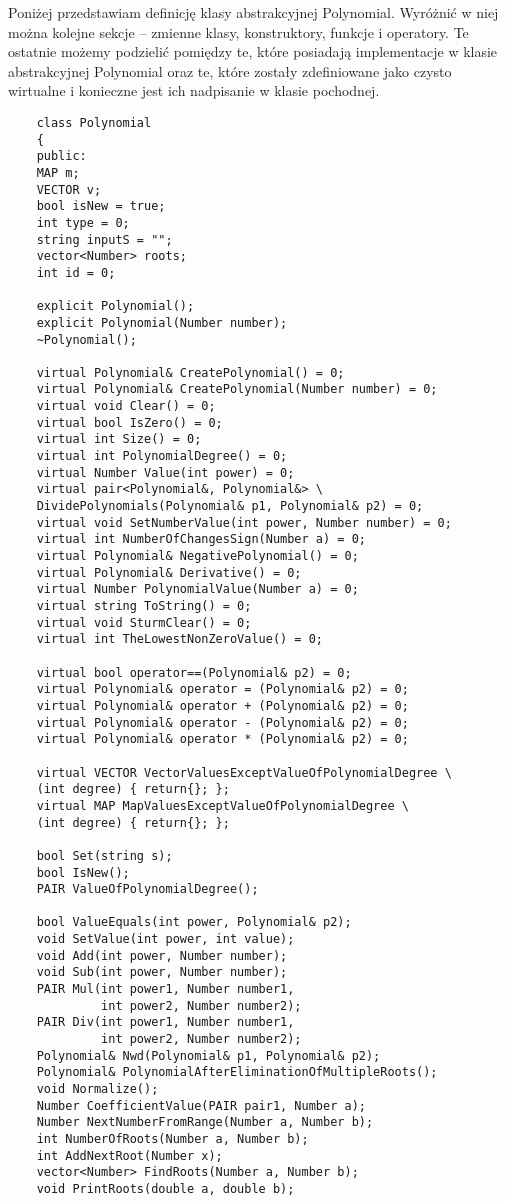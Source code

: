 \documentclass[oneside,a4paper]{book}
\begin{document}
	Poniżej przedstawiam definicję klasy abstrakcyjnej Polynomial. Wyróżnić w niej można kolejne sekcje -- zmienne klasy, konstruktory, funkcje i operatory. Te ostatnie możemy podzielić pomiędzy te, które posiadają implementacje w klasie abstrakcyjnej Polynomial oraz te, które zostały zdefiniowane jako czysto wirtualne i konieczne jest ich nadpisanie w klasie pochodnej.
	
	\begin{lstlisting}
	class Polynomial
	{
	public:
	MAP m;
	VECTOR v;
	bool isNew = true;
	int type = 0;
	string inputS = "";
	vector<Number> roots;
	int id = 0;
	
	explicit Polynomial();
	explicit Polynomial(Number number);
	~Polynomial();
	
	virtual Polynomial& CreatePolynomial() = 0;
	virtual Polynomial& CreatePolynomial(Number number) = 0;
	virtual void Clear() = 0;
	virtual bool IsZero() = 0;
	virtual int Size() = 0;
	virtual int PolynomialDegree() = 0;
	virtual Number Value(int power) = 0;
	virtual pair<Polynomial&, Polynomial&> \
	DividePolynomials(Polynomial& p1, Polynomial& p2) = 0;
	virtual void SetNumberValue(int power, Number number) = 0;
	virtual int NumberOfChangesSign(Number a) = 0;
	virtual Polynomial& NegativePolynomial() = 0;
	virtual Polynomial& Derivative() = 0;
	virtual Number PolynomialValue(Number a) = 0;
	virtual string ToString() = 0;
	virtual void SturmClear() = 0;
	virtual int TheLowestNonZeroValue() = 0;
	
	virtual bool operator==(Polynomial& p2) = 0;
	virtual Polynomial& operator = (Polynomial& p2) = 0;
	virtual Polynomial& operator + (Polynomial& p2) = 0;
	virtual Polynomial& operator - (Polynomial& p2) = 0;
	virtual Polynomial& operator * (Polynomial& p2) = 0;
	
	virtual VECTOR VectorValuesExceptValueOfPolynomialDegree \
	(int degree) { return{}; };
	virtual MAP MapValuesExceptValueOfPolynomialDegree \
	(int degree) { return{}; };
	
	bool Set(string s);
	bool IsNew();
	PAIR ValueOfPolynomialDegree();
	
	bool ValueEquals(int power, Polynomial& p2);
	void SetValue(int power, int value);
	void Add(int power, Number number);
	void Sub(int power, Number number);
	PAIR Mul(int power1, Number number1, 
	         int power2, Number number2);
	PAIR Div(int power1, Number number1,
	         int power2, Number number2);
	Polynomial& Nwd(Polynomial& p1, Polynomial& p2);
	Polynomial& PolynomialAfterEliminationOfMultipleRoots();
	void Normalize();
	Number CoefficientValue(PAIR pair1, Number a);
	Number NextNumberFromRange(Number a, Number b);
	int NumberOfRoots(Number a, Number b);
	int AddNextRoot(Number x);
	vector<Number> FindRoots(Number a, Number b);
	void PrintRoots(double a, double b);
	

\end{lstlisting}
\end{document}
